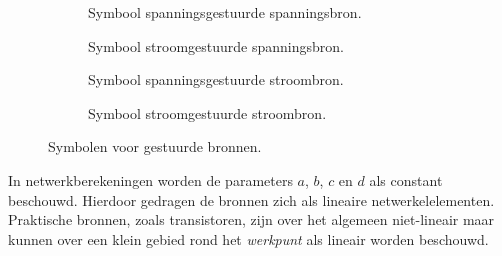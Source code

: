\begin{figure}[!ht]
\centering
\begin{subfigure}[t]{0.23\textwidth}
\centering
{}
\caption{Symbool spanningsgestuurde spanningsbron.}
\label{fig:gelsymbolengestuuurdebronnenen2vcvs}
\end{subfigure}
\begin{subfigure}[t]{0.23\textwidth}
\centering
{}
\caption{Symbool stroomgestuurde spanningsbron.}
\label{fig:gelsymbolengestuuurdebronnenen2ccvs}
\end{subfigure}
\begin{subfigure}[t]{0.23\textwidth}
\centering
{}
\caption{Symbool spanningsgestuurde stroombron.}
\label{fig:gelsymbolengestuuurdebronnenen2vccs}
\end{subfigure}
\begin{subfigure}[t]{0.23\textwidth}
\centering
{}
\caption{Symbool stroomgestuurde stroombron.}
\label{fig:gelsymbolengestuuurdebronnenen2cccs}
\end{subfigure}
\caption{Symbolen voor gestuurde bronnen.}
\label{fig:gelsymbolengestuuurdebronnenen2}
\end{figure}

In netwerkberekeningen worden de parameters $a$, $b$, $c$ en $d$ als constant beschouwd. Hierdoor gedragen de bronnen zich als lineaire netwerkelelementen. Praktische bronnen, zoals transistoren, zijn over het algemeen niet-lineair maar kunnen over een klein gebied rond het \textsl{werkpunt} als lineair worden beschouwd.

